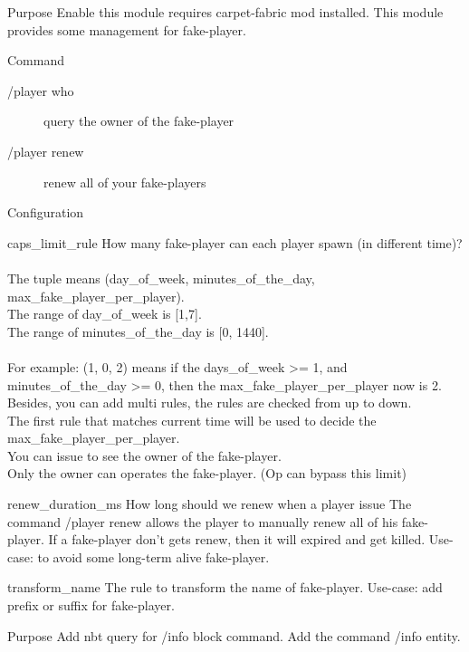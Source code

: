 


Purpose
Enable this module requires carpet-fabric mod installed.
This module provides some management for fake-player.

Command
\begin{description}
    \item [/player who] query the owner of the fake-player
    \item[/player renew] renew all of your fake-players
\end{description}

Configuration
\begin{Configuration}
    \item[caps\_limit\_rule] {
        How many fake-player can each player spawn (in different time)?\\
        \\
        The tuple means (day\_of\_week, minutes\_of\_the\_day, max\_fake\_player\_per\_player).\\
        The range of day\_of\_week is [1,7].\\
        The range of minutes\_of\_the\_day is [0, 1440].\\
        \\
        For example: (1, 0, 2) means if the days\_of\_week >= 1, and minutes\_of\_the\_day >= 0, then the max\_fake\_player\_per\_player now is 2.\\
        Besides, you can add multi rules, the rules are checked from up to down.\\
        The first rule that matches current time will be used to decide the max\_fake\_player\_per\_player.\\
        You can issue  to see the owner of the fake-player.\\
        Only the owner can operates the fake-player. (Op can bypass this limit)
    }

    \item[renew\_duration\_ms] {
        How long should we renew when a player issue 
        The command /player renew allows the player to manually renew all of his fake-player.
        If a fake-player don't gets renew, then it will expired and get killed.
        Use-case: to avoid some long-term alive fake-player.
    }

    \item[transform\_name]{
        The rule to transform the name of fake-player.
        Use-case: add prefix or suffix for fake-player.
    }

\end{Configuration}

\clearpage

Purpose
Add nbt query for /info block command.
Add the command /info entity.



